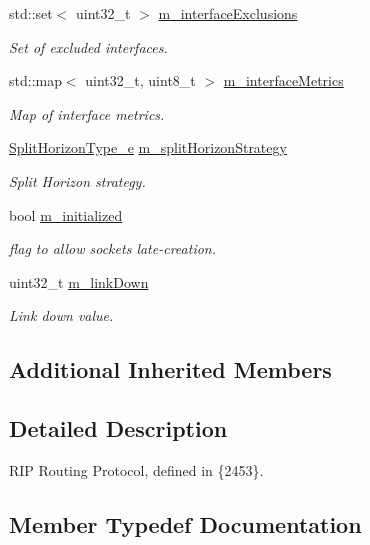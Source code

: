 \begin{DoxyCompactItemize}
std\+::set$<$ uint32\+\_\+t $>$ \hyperlink{classns3_1_1Rip_a30e2c00645f24a3b29be981f5d592773}{m\+\_\+interface\+Exclusions}
\begin{DoxyCompactList}\small\item\em Set of excluded interfaces. \end{DoxyCompactList}\item 
std\+::map$<$ uint32\+\_\+t, uint8\+\_\+t $>$ \hyperlink{classns3_1_1Rip_a297aac5454b10e21644490335f72364a}{m\+\_\+interface\+Metrics}
\begin{DoxyCompactList}\small\item\em Map of interface metrics. \end{DoxyCompactList}\item 
\hyperlink{classns3_1_1Rip_aa65e80d926399a90bc81b30dfc9404a4}{Split\+Horizon\+Type\+\_\+e} \hyperlink{classns3_1_1Rip_a2053001529a46356e1f612dfde6b4faf}{m\+\_\+split\+Horizon\+Strategy}
\begin{DoxyCompactList}\small\item\em Split Horizon strategy. \end{DoxyCompactList}\item 
bool \hyperlink{classns3_1_1Rip_adb494e48f6b5e4e42bf47a8ad3a25485}{m\+\_\+initialized}
\begin{DoxyCompactList}\small\item\em flag to allow socket\textquotesingle{}s late-\/creation. \end{DoxyCompactList}\item 
uint32\+\_\+t \hyperlink{classns3_1_1Rip_a3f37d4c5176e380482edf0be82d2fc18}{m\+\_\+link\+Down}
\begin{DoxyCompactList}\small\item\em Link down value. \end{DoxyCompactList}\end{DoxyCompactItemize}
\subsection*{Additional Inherited Members}


\subsection{Detailed Description}
R\+IP Routing Protocol, defined in \{2453\}. 

\subsection{Member Typedef Documentation}
